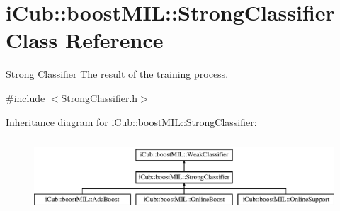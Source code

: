 \section{i\+Cub\+:\+:boost\+M\+I\+L\+:\+:Strong\+Classifier Class Reference}
\label{classiCub_1_1boostMIL_1_1StrongClassifier}


Strong Classifier The result of the training process.  




{\ttfamily \#include $<$Strong\+Classifier.\+h$>$}

Inheritance diagram for i\+Cub\+:\+:boost\+M\+I\+L\+:\+:Strong\+Classifier\+:\begin{figure}[H]
\begin{center}
\leavevmode
\includegraphics[height=2.814070cm]{classiCub_1_1boostMIL_1_1StrongClassifier}
\end{center}
\end{figure}
